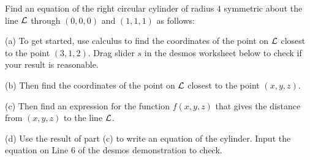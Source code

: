 \documentclass{ximera}
\begin{document}
\begin{question}  \label{QLK8df433rrw}
Find an equation of the right circular cylinder of radius $4$ symmetric about the line ${\cal L}$ through $(0,0,0)$ and $(1,1,1)$ as follows:

(a) To get started, use calculus to find the coordinates of the point on ${\cal L}$ closest to the point $(3,1,2)$. Drag slider $s$ in the desmos worksheet below to check if your result is reasonable.

\begin{onlineOnly}
    \begin{center}
\end{center}
\end{onlineOnly}


(b) Then find the coordinates of the point on ${\cal L}$ closest to the point $(x,y,z)$.

(c) Then find an expression for the function $f(x,y,z)$ that gives the distance from $(x,y,z)$ to the line ${\cal L}$.

(d) Use the result of part (c) to write an equation of the cylinder. Input the equation on Line 6 of the desmos demonstration to check.
 
\end{question}
\end{document}
